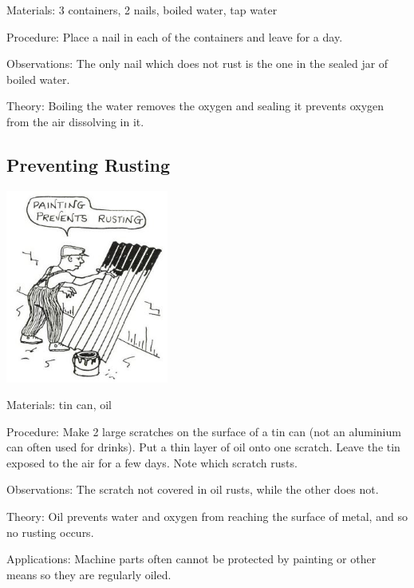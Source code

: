 \begin{multicols}{2}
\begin{description*}
\item[Materials:]{3 containers, 2 nails, boiled water, tap water}
\item[Procedure:]{Place a nail in each of the
containers and leave for a day.}
\item[Observations:]{The only nail which does not rust
is the one in the sealed jar of
boiled water.}
\item[Theory:]{Boiling the water
removes the oxygen and sealing it
prevents oxygen from the air
dissolving in it.}
\end{description*}

\subsection{Preventing Rusting} %

\begin{center}
\includegraphics[width=0.4\textwidth]{./img/source/rusting-prevent.jpg}
\end{center}

\begin{description*}
\item[Materials:]{tin can, oil}
\item[Procedure:]{Make 2 large scratches on the surface of a tin can (not an aluminium
can often used for drinks). Put a thin layer of oil onto one scratch.
Leave the tin exposed to the air for a few days. Note which scratch
rusts.}
\item[Observations:]{The scratch not covered in oil rusts, while the other does not.}
\item[Theory:]{Oil prevents water and oxygen from reaching the surface of metal, and so no rusting occurs.}
\item[Applications:]{Machine parts often cannot be protected by painting or other means so they are regularly oiled.}
\end{description*}


\end{multicols}
